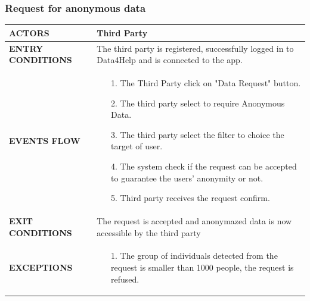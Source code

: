 \documentclass[a4paper]{article}
\begin{document}
    \vspace{1cm}
    
    \subsubsection{Request for anonymous data}
    \begin{center}
        \begin{tabular}{l || p{8cm} ||}
            \bf{ACTORS} & Third Party \\ \hline
            \bf{ENTRY CONDITIONS} & The third party is registered, successfully logged in to Data4Help and is connected to the app.\\ \hline
            \bf{EVENTS FLOW} & \begin{itemize}[noitemsep, topsep=0cm, leftmargin=*] \vspace{-0.2cm}
                \item[1.] The Third Party click on "Data Request" button.
                \item[2.] The third party select to require Anonymous Data.
                \item[3.] The third party select the filter to choice the target of user.
                \item[4.] The system check if the request can be accepted to guarantee the users' anonymity or not.
                \item[5.] Third party receives the request confirm.
            \end{itemize}
            \\ \hline
            \bf{EXIT CONDITIONS} & The request is accepted and anonymazed data is now accessible by the third party\\ \hline
            \bf{EXCEPTIONS} &\begin{itemize}[noitemsep, topsep=0cm, leftmargin=*] \vspace{-0.2cm}
                \item[1.] The group of individuals detected from the request is smaller than 1000 people, the request is refused.
            \end{itemize}
            \\ \hline \hline
        \end{tabular}
    \end{center}
    
    \vspace{1cm}
    
\end{document}
